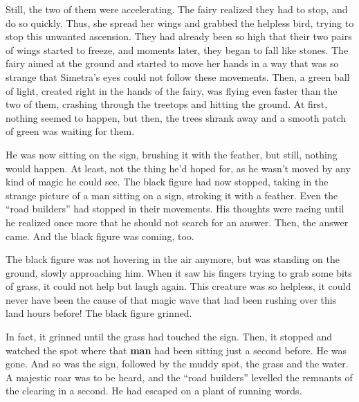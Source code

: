 Still, the two of them were accelerating. The fairy realized they had to stop, and do so quickly. Thus, she spread her wings and grabbed the helpless bird, trying to stop this unwanted ascension. They had already been so high that their two pairs of wings started to freeze, and moments later, they began to fall like stones. The fairy aimed at the ground and started to move her hands in a way that was so strange that Simetra's eyes could not follow these movements. Then, a green ball of light, created right in the hands of the fairy, was flying even faster than the two of them, crashing through the treetops and hitting the ground. At first, nothing seemed to happen, but then, the trees shrank away and a smooth patch of green was waiting for them. 

\fancybreaker{}

He was now sitting on the sign, brushing it with the feather, but still, nothing would happen. At least, not the thing he'd hoped for, as he wasn't moved by any kind of magic he could see. The black figure had now stopped, taking in the strange picture of a man sitting on a sign, stroking it with a feather. Even the \enquote{road builders} had stopped in their movements.
His thoughts were racing until he realized once more that he should not search for an answer. Then, the answer came. And the black figure was coming, too.

\fancybreaker{}

The black figure was not hovering in the air anymore, but was standing on the ground, slowly approaching him. When it saw his fingers trying to grab some bits of grass, it could not help but laugh again. This creature was so helpless, it could never have been the cause of that magic wave that had been rushing over this land hours before! 
The black figure grinned.

In fact, it grinned until the grass had touched the sign. Then, it stopped and watched the spot where that \textbf{man} had been sitting just a second before. 
He was gone. 
And so was the sign, followed by the muddy spot, the grass and the water. A majestic roar was to be heard, and the \enquote{road builders} levelled the remnants of the clearing in a second.
He had escaped on a plant of running words.
